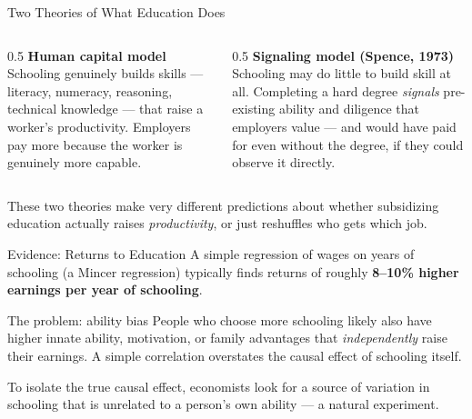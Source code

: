 \documentclass[11pt,aspectratio=169]{beamer}
\begin{document}
\begin{frame}{Two Theories of What Education Does}
  \begin{columns}[T]
    \begin{column}{0.5\textwidth}
      \textbf{Human capital model}\\
      \small Schooling genuinely builds skills --- literacy, numeracy, reasoning, technical knowledge --- that raise a worker's productivity. Employers pay more because the worker is genuinely more capable.
    \end{column}
    \begin{column}{0.5\textwidth}
      \textbf{Signaling model (Spence, 1973)}\\
      \small Schooling may do little to build skill at all. Completing a hard degree \emph{signals} pre-existing ability and diligence that employers value --- and would have paid for even without the degree, if they could observe it directly.
    \end{column}
  \end{columns}
  \vspace{0.6em}
  \small These two theories make very different predictions about whether subsidizing education actually raises \emph{productivity}, or just reshuffles who gets which job.
\end{frame}

\begin{frame}{Evidence: Returns to Education}
  A simple regression of wages on years of schooling (a Mincer regression) typically finds returns of roughly \textbf{8--10\% higher earnings per year of schooling}.
  \begin{alertblock}{The problem: ability bias}
    People who choose more schooling likely also have higher innate ability, motivation, or family advantages that \emph{independently} raise their earnings. A simple correlation overstates the causal effect of schooling itself.
  \end{alertblock}
  \small To isolate the true causal effect, economists look for a source of variation in schooling that is unrelated to a person's own ability --- a natural experiment.
\end{frame}
\end{document}
